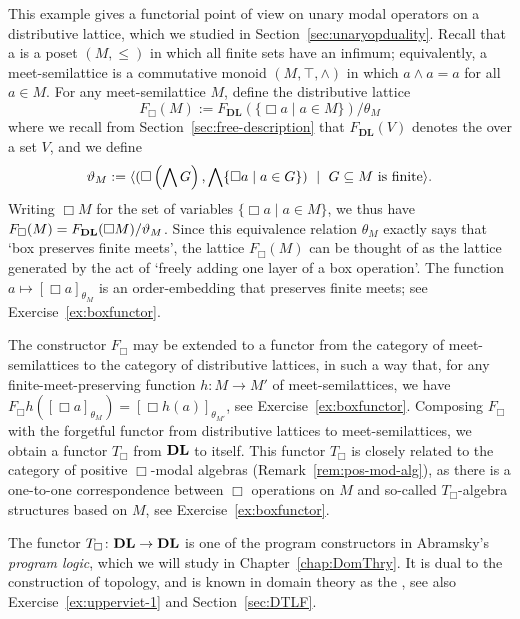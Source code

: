 \begin{example}\label{exa:modal-alg-functor}
  This example gives a functorial point of view on unary modal operators on a distributive lattice, which we studied in Section~\ref{sec:unaryopduality}. Recall that a  is a poset $(M, \leq)$ in which all finite sets have an infimum; equivalently, a meet-semilattice is a commutative monoid $(M, \top, \wedge)$ in which $a \wedge a = a$ for all $a \in M$.
  For any meet-semilattice $M$, define the distributive lattice 
  \[
  F_\Box(M) := F_{\mathbf{DL}} (\{\Box a\mid a\in M\})/\theta_M
  \]
  where we recall from Section~\ref{sec:free-description} that $F_{\mathbf{DL}}(V)$ denotes the  over a set $V$, and we define 
  \[
  \theta_M := \gen{(\Box\left(\bigwedge G\right),\bigwedge\{\Box a\mid a\in G\})\ \mid\ G\subseteq M\text{  is finite}}.
  \]
   Writing $\Box M$ for the set of variables $\{\Box a \mid a \in M\}$, we thus have $F_{\Box}(M) =  F_{\mathbf{DL}}(\Box M) / {\vartheta_M}$. 
  Since this equivalence relation $\theta_M$ exactly says that `box preserves finite meets', the lattice $F_\Box(M)$ can be thought of as the lattice generated by the act of `freely adding one layer of a box operation'. The function $a \mapsto [\Box a]_{\theta_M}$ is an order-embedding that preserves finite meets; see Exercise~\ref{ex:boxfunctor}.
  
  The constructor $F_\Box$ may be extended to a functor from the category of meet-semilattices to the category of distributive lattices, in such a way that, for any finite-meet-preserving function $h\colon M\to M'$  of  meet-semilattices, we have $F_\Box h([\Box a]_{\theta_M}) = [\Box h(a)]_{\theta_{M'}}$, see Exercise~\ref{ex:boxfunctor}. Composing $F_\Box$ with the forgetful functor from distributive lattices to meet-semilattices, we obtain a functor $T_\Box$ from $\mathbf{DL}$ to itself. This  functor $T_\Box$ is closely related to the category of positive $\Box$-modal algebras (Remark~\ref{rem:pos-mod-alg}),  as there is a one-to-one correspondence between $\Box$ operations on $M$ and so-called $T_\Box$-algebra structures based on $M$, see Exercise~\ref{ex:boxfunctor}. 
  
  The functor $T_\Box \colon \mathbf{DL} \to \mathbf{DL}$ is one of the program constructors in Abramsky's \emph{program logic}, which we will study in Chapter~\ref{chap:DomThry}. It is dual to the  construction of topology, and is known in domain theory as the , see also Exercise~\ref{ex:upperviet-1} and  Section~\ref{sec:DTLF}.
  \end{example}
  \exercises

